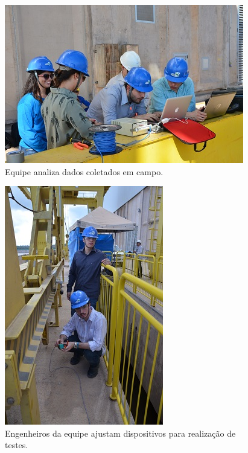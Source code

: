\begin{figure}[h!]
  \centering
  \includegraphics[width=1\linewidth]{Fotos/JirauJunho2014/7.JPG}
  \caption{Equipe analiza dados coletados em campo.}
  \label{nov20132}
\end{figure}

\begin{figure}[h!]
  \centering
  \includegraphics[width=1\linewidth]{Fotos/JirauJunho2014/8.JPG}
  \caption{Engenheiros da equipe ajustam dispositivos para realização de
  testes.}
  \label{nov20133}
\end{figure}

